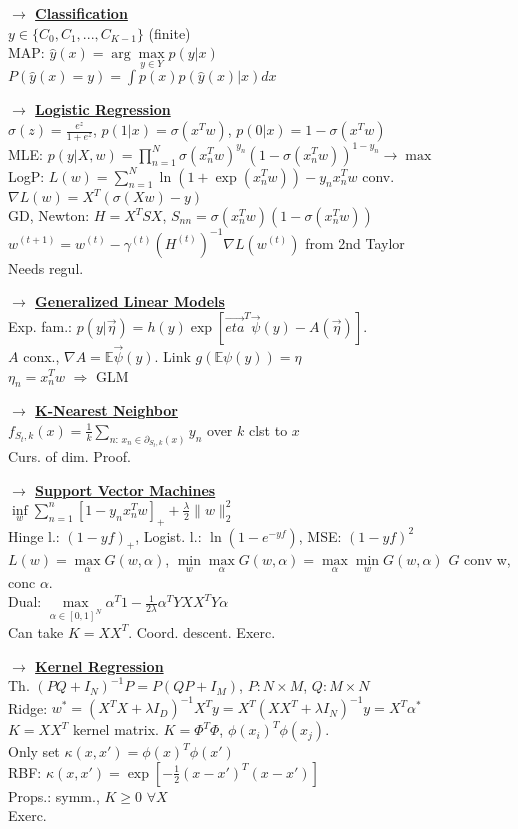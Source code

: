 \documentclass[]{article}
\newcommand{\mytitle}[1]{ {\bf $\rightarrow$ \underline{#1}}\\}
\begin{document}
\begin{multicols*}{2}
\mytitle{Classification}
$y\in \{C_0,C_1,...,C_{K-1}\}$ (finite)\\
MAP: $\hat{y}(x)=\arg\max\limits_{y\in Y}p(y|x)$\\
$P(\hat{y}(x)=y)=\int p(x)p(\hat{y}(x)|x)dx$


\mytitle{Logistic Regression}
$\sigma(z)=\frac{e^z}{1+e^z}$, $p(1|x)=\sigma(x^Tw)$, $p(0|x)=1-\sigma(x^Tw)$\\
MLE: $p(y|X,w)=\prod\limits_{n=1}^N\sigma(x_n^Tw)^{y_n}\left(1-\sigma(x_n^Tw)\right)^{1-y_n}\to\max$\\
LogP: $L(w)=\sum\limits_{n=1}^N\ln(1+\exp(x_n^Tw))-y_nx_n^Tw$ conv.\\
$\nabla L(w)=X^T(\sigma(Xw)-y)$\\
GD, Newton: $H=X^TSX$, $S_{nn}=\sigma(x_n^Tw)(1-\sigma(x_n^Tw))$\\
$w^{(t+1)}=w^{(t)}-\gamma^{(t)}(H^{(t)})^{-1}\nabla L(w^{(t)})$ from 2nd Taylor\\
Needs regul.

\mytitle{Generalized Linear Models}
Exp. fam.: $p(y|\vec{\eta})=h(y)\exp\left[\vec{eta}^T\vec{\psi}(y)-A(\vec{\eta})\right]$.\\
$A$ conx., $\nabla A=\mathbb{E}\vec{\psi}(y)$. Link $g(\mathbb{E}\psi(y))=\eta$\\
$\eta_n=x_n^Tw$ $\Rightarrow$ GLM

\mytitle{K-Nearest Neighbor}
$f_{S_t,k}(x)=\frac{1}{k}\sum\limits_{n\colon\,x_n\in \partial_{S_t,k}(x)}y_n$ over $k$ clst to $x$\\
Curs. of dim. Proof.

\mytitle{Support Vector Machines}
$\inf\limits_w\sum\limits_{n=1}^n\left[1-y_nx_n^Tw\right]_++\frac{\lambda}{2}\|w\|^2_2$\\
Hinge l.: $(1-yf)_+$, Logist. l.: $\ln(1-e^{-yf})$, MSE: $(1-yf)^2$\\
$L(w)=\max\limits_\alpha G(w,\alpha)$, $\min\limits_w\max\limits_\alpha G(w,\alpha)=\max\limits_\alpha\min\limits_w G(w,\alpha)$
$G$ conv w, conc $\alpha$.\\
Dual: $\max\limits_{\alpha\in[0,1]^N}\alpha^T1-\frac{1}{2\lambda}\alpha^TYXX^TY\alpha$\\
Can take $K=XX^T$. Coord. descent. Exerc.

\mytitle{Kernel Regression}
Th. $(PQ+I_N)^{-1}P=P(QP+I_M)$, $P\colon N\times M$, $Q\colon M\times N$\\
Ridge: $w^*=(X^TX+\lambda I_D)^{-1}X^Ty=X^T(XX^T+\lambda I_N)^{-1}y=X^T\alpha^*$\\
$K=XX^T$ kernel matrix. $K=\Phi^T\Phi$, $\phi(x_i)^T\phi(x_j)$.\\
Only set $\kappa(x,x')=\phi(x)^T\phi(x')$\\
RBF: $\kappa(x,x')=\exp\left[-\frac{1}{2}(x-x')^T(x-x')\right]$\\
Props.: symm., $K\geqslant 0$ $\forall X$\\
Exerc.


\end{multicols*}
\end{document}
